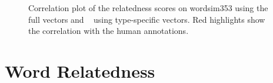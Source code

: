 \begin{figure}
\centering
{}

\caption{Correlation plot of the relatedness scores on wordsim353 using the~ full vectors and ~ using type-specific vectors. Red highlights show the correlation with the human annotations.}
\label{fig:wordsim_cor}
\end{figure}




\section{Word Relatedness}\label{sec:relatedness}

